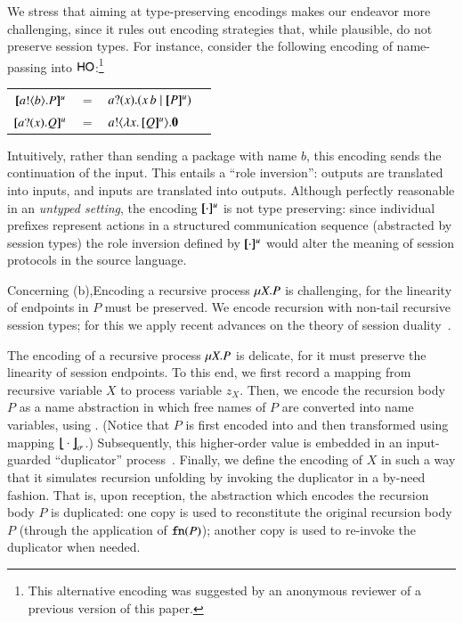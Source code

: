 We stress that aiming at type-preserving encodings 
makes our endeavor more challenging, since it rules out encoding strategies that, while plausible, do 
not preserve session types. For instance, consider the 
following encoding of %
name-passing 
into $\mathsf{HO}$:\footnote{This alternative  encoding was suggested by an anonymous reviewer of a previous version of this paper.} %
\begin{center}
\begin{tabular}{rcll}
  $[\!\![a ! \langle b \rangle . P]\!\!]^u$	&$=$&	$a ? (x) .( x\, {b} \;|\; [\!\![P]\!\!]^u)$ \\
  $[\!\![a ? (x) . Q]\!\!]^u$	&$=$&	$a ! \langle \lambda x.\,[\!\![Q]\!\!]^u \rangle . \mathbf{0}$
\end{tabular}
\end{center}
Intuitively, 
rather than sending a package with name $b$, 
this encoding sends the continuation of the input. This entails  a 
``role inversion'': outputs are translated into inputs, and inputs are translated into outputs. 
Although perfectly reasonable in an \emph{untyped setting}, the encoding $[\!\![\cdot]\!\!]^u$  
is not type preserving: 
since 
individual  prefixes represent actions in a structured communication sequence (abstracted by session types)
the role inversion defined by $[\!\![\cdot]\!\!]^u$ would alter the meaning of session protocols in the source language.

Concerning (b),Encoding a recursive process $\mu X. P$ is  challenging, for 
the linearity of endpoints in $P$ must be preserved.
We encode recursion with non-tail recursive session types; for this 
we apply recent advances on the theory of session duality~\cite{TGC14,DBLP:journals/corr/abs-1202-2086}.

The encoding of a recursive process $\mu X. P$  is delicate, for it 
must preserve the linearity of session endpoints. To this end, we
first record a mapping from recursive variable $X$ to process variable $z_X$.
Then, we encode the recursion body $P$ as a name abstraction
in which free names of $P$ are converted into name variables, using .
(Notice that $P$ is first encoded into \HO and then transformed using mapping
$\big\lfloor\!\!\big\lfloor\cdot\big\rfloor\!\!\big\rfloor^{}_\sigma$.)
Subsequently, this higher-order value is embedded in an input-guarded 
``duplicator'' process~\cite{ThomsenB:plachoasgcfhop}. Finally, we define the encoding of $X$ 
in such a way that it
simulates recursion unfolding by 
invoking the duplicator in a by-need fashion.
That is, upon reception, the \HO abstraction which encodes  the 
recursion body $P$
is duplicated: 
one copy is used to reconstitute the original recursion body $P$ (through
the application of $\mathtt{fn}(P)$); another copy is used to re-invoke
the duplicator when needed. 

